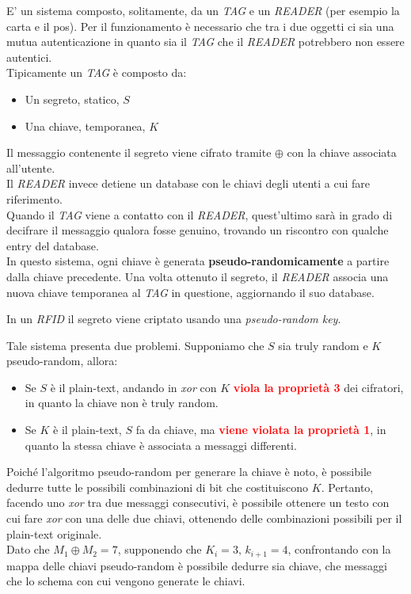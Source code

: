 \begin{example}[ RFID:]
E' un sistema composto, solitamente, da un \emph{TAG} e un \emph{READER} (per esempio la carta e il pos). Per il funzionamento è necessario che tra i due oggetti ci sia una mutua autenticazione in quanto sia il \emph{TAG} che il \emph{READER} potrebbero non essere autentici.\\
Tipicamente un \emph{TAG} è composto da:
\begin{itemize}
    \item Un segreto, statico, $S$
    \item Una chiave, temporanea, $K$
\end{itemize}
Il messaggio contenente il segreto viene cifrato tramite $\oplus$ con la chiave associata all'utente.\\
Il \emph{READER} invece detiene un database con le chiavi degli utenti a cui fare riferimento.\\
Quando il \emph{TAG} viene a contatto con il \emph{READER}, quest'ultimo sarà in grado di decifrare il messaggio qualora fosse genuino, trovando un riscontro con qualche entry del database.\\
In questo sistema, ogni chiave è generata \textbf{pseudo-randomicamente} a partire dalla chiave precedente. Una volta ottenuto il segreto, il \emph{READER} associa una nuova chiave temporanea al \emph{TAG} in questione, aggiornando il suo database.
\begin{remark}
In un \emph{RFID} il segreto viene criptato usando una \emph{pseudo-random key}.
\end{remark}
Tale sistema presenta due problemi. Supponiamo che $S$ sia truly random e $K$ pseudo-random, allora:
\begin{itemize}
    \item Se $S$ è il plain-text, andando in \emph{xor} con $K$ \textcolor{red}{\textbf{viola la proprietà 3}} dei cifratori, in quanto la chiave non è truly random.
    \item Se $K$ è il plain-text, $S$ fa da chiave, ma \textcolor{red}{\textbf{viene violata la proprietà 1}}, in quanto la stessa chiave è associata a messaggi differenti.
\end{itemize}
Poiché l'algoritmo pseudo-random per generare la chiave è noto, è possibile dedurre tutte le possibili combinazioni di bit che costituiscono $K$. Pertanto, facendo uno \emph{xor} tra due messaggi consecutivi, è possibile ottenere un testo con cui fare \emph{xor} con una delle due chiavi, ottenendo delle combinazioni possibili per il plain-text originale.\\
Dato che $M_1\oplus{M_2}=7$, supponendo che $K_i=3,\,k_{i+1}=4$, confrontando con la mappa delle chiavi pseudo-random è possibile dedurre sia chiave, che messaggi che lo schema con cui vengono generate le chiavi.
\end{example}
